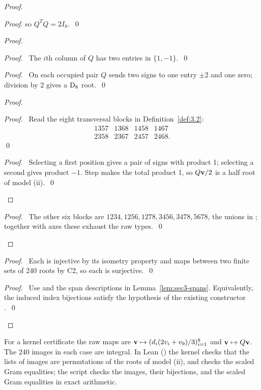 \begin{proof}
\begin{proof}
  so $Q^TQ=2I_8$.~\qed\end{proof}
 \begin{proof}
  \begin{proof}\pf\ The $i$th column of $Q$ has two entries in $\{1,-1\}$.~\qed\end{proof}
  \begin{proof}\pf\ On each occupied pair $Q$ sends two signs to one entry $\pm2$
   and one zero; division by 2 gives a $\mathrm{D}_8$ root.~\qed\end{proof}
  \begin{proof}
   \begin{proof}\pf\ Read the eight transversal blocks in Definition~\ref{def:3.2}:
    \[\begin{array}{rrrr}1357&1368&1458&1467\\2358&2367&2457&2468.\end{array}\]
    \qed\end{proof}
   \qedstep
   \begin{proof}\pf\ Selecting a first position gives a pair of signs with product 1;
    selecting a second gives product $-1$. Step  makes the total
    product 1, so $Q{\mathbf v}/2$ is a half root of model (ii).~\qed\end{proof}
  \end{proof}
  \qedstep
  \begin{proof}\pf\ The other six blocks are $1234,1256,1278,3456,3478,5678$,
   the unions in ; together with axes these exhaust the raw types.~\qed\end{proof}
 \end{proof}
 \begin{proof}\pf\ Each is injective by its isometry property and maps between two
  finite sets of 240 roots by C2, so each is surjective.~\qed\end{proof}
 \qedstep
 \begin{proof}\pf\ Use  and the span descriptions in
  Lemma~\ref{lem:sec3-spans}. Equivalently, the induced index bijections satisfy
  the hypothesis of the existing constructor .~\qed\end{proof}
\end{proof}
For a kernel certificate the raw maps are
${\mathbf v}\mapsto(d_i(2v_i+v_9)/3)_{i=1}^8$ and ${\mathbf v}\mapsto Q{\mathbf v}$.
The 240 images in each case are integral. In Lean () the kernel
checks that the lists of images are permutations of the roots of model (ii), and checks the
scaled Gram equalities; the script  checks the images,
their bijections, and the scaled Gram equalities in exact arithmetic.

